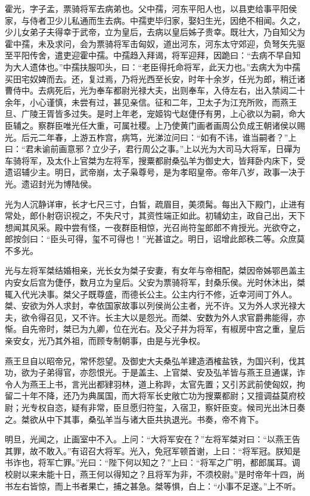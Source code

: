 \documentclass[UTF8,titlepage,oneside]{ctexbook}
\begin{document}
霍光，字子孟，票骑将军去病弟也。父中孺，河东平阳人也，以县吏给事平阳侯家，与侍者卫少儿私通而生去病。中孺吏毕归家，娶妇生光，因绝不相闻。久之，少儿女弟子夫得幸于武帝，立为皇后，去病以皇后姊子贵幸。既壮大，乃自知父为霍中孺，未及求问，会为票骑将军击匈奴，道出河东，河东太守郊迎，负弩矢先驱至平阳传舍，遣吏迎霍中孺。中孺趋入拜谒，将军迎拜，因跪曰：“去病不早自知为大人遗体也。”中孺扶服叩头，曰：“老臣得托命将军，此天力也。”去病大为中孺买田宅奴婢而去。还，复过焉，乃将光西至长安，时年十余岁，任光为郎，稍迁诸曹侍中。去病死后，光为奉车都尉光禄大夫，出则奉车，入侍左右，出入禁闼二十余年，小心谨慎，未尝有过，甚见亲信。征和二年，卫太子为江充所败，而燕王旦、广陵王胥皆多过失。是时上年老，宠姬钩弋赵倢伃有男，上心欲以为嗣，命大臣辅之。察群臣唯光任大重，可属社稷。上乃使黄门画者画周公负成王朝诸侯以赐光。后元二年春，上游五柞宫，病笃，光涕泣问曰：“如有不讳，谁当嗣者？”上曰：“君未谕前画意邪？立少子，君行周公之事。”上以光为大司马大将军，日磾为车骑将军，及太仆上官桀为左将军，搜粟都尉桑弘羊为御史大，皆拜卧内床下，受遗诏辅少主。明日，武帝崩，太子枭尊号，是为孝昭皇帝。帝年八岁，政事一决于光。遗诏封光为博陆侯。


光为人沉静详审，长才七尺三寸，白皙，疏眉目，美须髯。每出入下殿门，止进有常处，郎仆射窃识视之，不失尺寸，其资性端正如此。初辅幼主，政自己出，天下想闻其风采。殿中尝有怪，一夜群臣相惊，光召尚符玺郎郎不肯授光。光欲夺之，郎按剑曰：“臣头可得，玺不可得也！”光甚谊之。明日，诏增此郎秩二等。众庶莫不多光。


光与左将军桀结婚相亲，光长女为桀子安妻，有女年与帝相配，桀因帝姊鄂邑盖主内安女后宫为倢伃，数月立为皇后。父安为票骑将军，封桑乐侯。光时休沐出，桀辄入代光决事。桀父子既尊盛，而德长公主。公主内行不修，近幸河间丁外人。桀、安欲为外人求封，幸依国家故事以列侯尚公主者，光不许。又为外人求光禄大夫，欲令得召见，又不许。长主大以是怨光。而桀、安数为外人求官爵弗能得，亦惭。自先帝时，桀已为九卿，位在光右。及父子并为将军，有椒房中宫之重，皇后亲安女，光乃其外祖，而顾专制朝事，由是与光争权。


燕王旦自以昭帝兄，常怀怨望。及御史大夫桑弘羊建造酒榷盐铁，为国兴利，伐其功，欲为子弟得官，亦怨恨光。于是盖主、上官桀、安及弘羊皆与燕王旦通谋，诈令人为燕王上书，言光出都肄羽林，道上称跸，太官先置；又引苏武前使匈奴，拘留二十年不降，还乃为典属国，而大将军长史敞亡功为搜粟都尉；又擅调益莫府校尉；光专权自恣，疑有非常，臣旦愿归符玺，入宿卫，察奸臣变。候司光出沐日奏之。桀欲从中下其事，桑弘羊当与诸大臣共执退光。书奏，帝不肯下。


明旦，光闻之，止画室中不入。上问：“大将军安在？”左将军桀对曰：“以燕王告其罪，故不敢入。”有诏召大将军。光入，免冠军顿首谢，上曰：“将军冠。朕知是书诈也，将军亡罪。”光曰：“陛下何以知之？”上曰：“将军之广明，都郎属耳。调校尉以来未能十日，燕王何以得知之？且将军为非，不须校尉。”是时帝年十四，尚书左右皆惊，而上书者果亡，捕之甚急。桀等惧，白上：“小事不足遂。”上不听。
\end{document}
